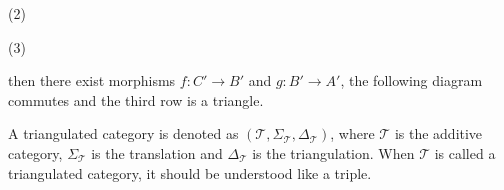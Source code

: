 \begin{definition}
\begin{enumerate}
\begin{center}
                    (2)

                    (3)
                \end{center}
                then there exist morphisms $f : C' \rightarrow B'$ and $g : B' \rightarrow A'$, the following diagram commutes and the third row is a triangle.

                \begin{center}
                \end{center}
        \end{enumerate}
    \end{definition}

    A triangulated category is denoted as $(\mathcal{T}, \Sigma_{\mathcal{T}}, \Delta_{\mathcal{T}})$, where $\mathcal{T}$ is the additive category, $\Sigma_{\mathcal{T}}$ is the translation and $\Delta_{\mathcal{T}}$ is the triangulation. When $\mathcal{T}$ is called a triangulated category, it should be understood like a triple.
    
